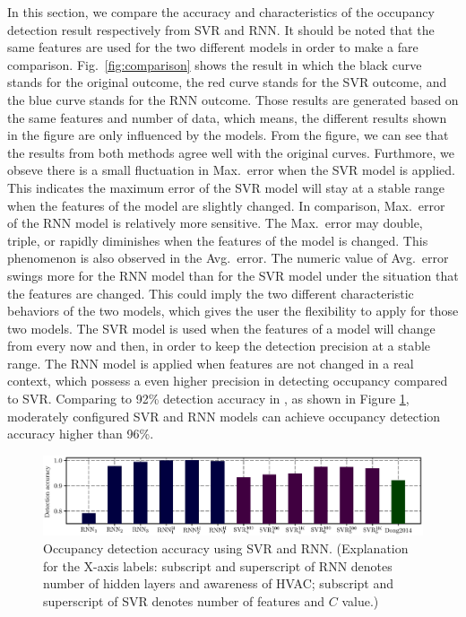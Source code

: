 \textcolor{feb18rev}{In this section, we compare the accuracy and characteristics of the
occupancy detection result respectively from SVR and RNN. It should be noted that the same
features are used for the two different models in order to make a fare comparison.}
Fig.~\ref{fig:comparison} shows the result in which the black curve
stands for the original outcome, the red curve stands for the SVR
outcome, and the blue curve stands for the RNN outcome.  Those results
are generated based on the same features and number of data, which
means, the different results shown in the figure are only influenced
by the models. From the figure, we can see that the results from both
methods agree well with the original curves.  Furthmore, we obseve
there is a small fluctuation in Max.~error when the SVR model is
applied. This indicates the maximum error of the SVR model will stay
at a stable range when the features of the model are slightly
changed. In comparison, Max.~error of the RNN model is relatively more
sensitive. The Max.~error may double, triple, or rapidly diminishes
when the features of the model is changed. This phenomenon is also
observed in the Avg.~error. The numeric value of Avg.~error swings
more for the RNN model than for the SVR model under the situation that
the features are changed. This could imply the two different
characteristic behaviors of the two models, which gives the user the
flexibility to apply for those two models. The SVR model is used when
the features of a model will change from every now and then, in order
to keep the detection precision at a stable range. The RNN model is applied
when features are not changed in a real context, which possess a even higher
precision in detecting occupancy compared to SVR.
\textcolor{feb18rev}{Comparing to 92\% detection accuracy in \cite
{dong2014real}, as shown in Figure \ref{fig:accuracy-comparison}, moderately
configured SVR and RNN models can achieve occupancy detection accuracy higher
than 96\%.}

\begin{figure}[h]
    \centering
    \includegraphics[width=\textwidth]{./figs/results/results_compare.eps}
    \caption{\textcolor{feb18rev}{Occupancy detection accuracy using SVR and
    RNN. (Explanation for the X-axis labels: subscript and superscript of RNN
    denotes number of hidden layers and awareness of HVAC; subscript and
    superscript of SVR denotes number of features and $C$ value.)}}
    \label{fig:accuracy-comparison}
\end{figure}

